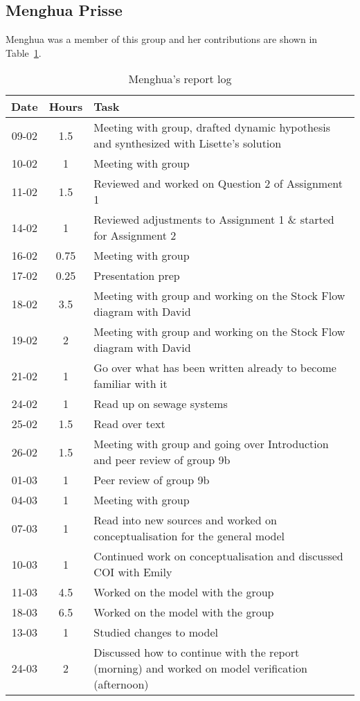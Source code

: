 
\subsection{Menghua Prisse}
Menghua was a member of this group and her contributions are shown in Table~\ref{tab:menghua_log}. 
\begin{longtable}[c]{c|c|m{35em}}
\caption{Menghua's report log}
\label{tab:menghua_log}\\
\textbf{Date}& \textbf{Hours} & \textbf{Task} \\
\hline
\endfirsthead
%
\endhead
%
09-02  & 1.5 & Meeting with group, drafted dynamic hypothesis and synthesized with Lisette's solution\\
10-02 & 1 & Meeting with group \\ 
11-02 & 1.5 & Reviewed and worked on Question 2 of Assignment 1 \\
14-02 & 1 & Reviewed adjustments to Assignment 1 \& started for Assignment 2 \\ 
16-02 & 0.75 & Meeting with group \\ 
17-02 & 0.25 & Presentation prep \\
18-02 & 3.5 & Meeting with group and working on the Stock Flow diagram with David  \\
19-02 & 2 & Meeting with group and working on the Stock Flow diagram with David \\ 
21-02 & 1 & Go over what has been written already to become familiar with it \\
24-02 & 1 & Read up on sewage systems \\ 
25-02 & 1.5 & Read over text \\ 
26-02 & 1.5 & Meeting with group and going over Introduction and peer review of group 9b \\ 
01-03 & 1 & Peer review of group 9b \\
04-03 & 1 & Meeting with group \\
07-03 & 1 & Read into new sources and worked on conceptualisation for the general model \\ 
10-03 & 1 & Continued work on conceptualisation and discussed COI with Emily \\ 
11-03 & 4.5 & Worked on the model with the group \\
18-03 & 6.5 & Worked on the model with the group \\
13-03 & 1 & Studied changes to model \\ 
24-03 & 2 & Discussed how to continue with the report (morning) and worked on model verification (afternoon) \\ 

\end{longtable}
